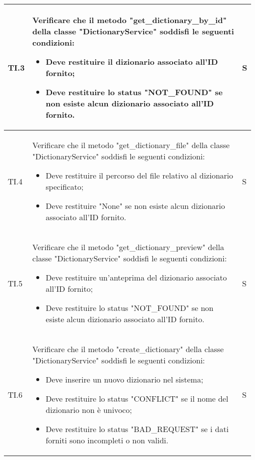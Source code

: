 \begin{adjustwidth}{-0.5cm}{-0.5cm}
\begin{longtable}{|P{1.5cm}|>{\raggedright}P{9.5cm}|>{\arraybackslash}P{1.5cm}|}
		\hline TI.3 & Verificare che il metodo "get\_dictionary\_by\_id" della classe "DictionaryService" soddisfi le seguenti condizioni:
		\begin{itemize}
			\item Deve restituire il dizionario associato all'ID fornito;
			\item Deve restituire lo status "NOT_FOUND" se non esiste alcun dizionario associato all'ID fornito.
		\end{itemize} & S \\

		\hline TI.4 & Verificare che il metodo "get\_dictionary\_file" della classe "DictionaryService" soddisfi le seguenti condizioni:
		\begin{itemize}
			\item Deve restituire il percorso del file relativo al dizionario specificato;
			\item Deve restituire "None" se non esiste alcun dizionario associato all'ID fornito.
		\end{itemize} & S \\

		\hline TI.5 & Verificare che il metodo "get\_dictionary\_preview" della classe "DictionaryService" soddisfi le seguenti condizioni:
		\begin{itemize}
			\item Deve restituire un'anteprima del dizionario associato all'ID fornito;
			\item Deve restituire lo status "NOT_FOUND" se non esiste alcun dizionario associato all'ID fornito.
		\end{itemize} & S \\

		\hline TI.6 & Verificare che il metodo "create\_dictionary" della classe "DictionaryService" soddisfi le seguenti condizioni:
		\begin{itemize}
			\item Deve inserire un nuovo dizionario nel sistema;
			\item Deve restituire lo status "CONFLICT" se il nome del dizionario non è univoco;
			\item Deve restituire lo status "BAD_REQUEST" se i dati forniti sono incompleti o non validi.
		\end{itemize} & S \\


\end{longtable}
\end{adjustwidth}
